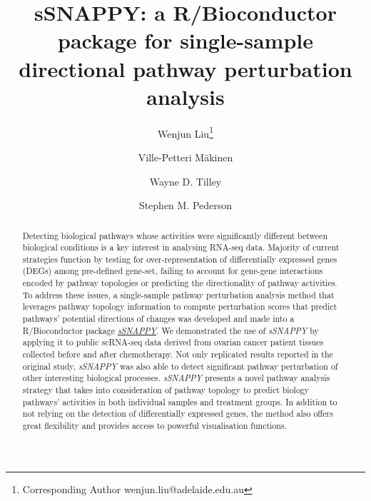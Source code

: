 \documentclass[9pt,a4paper,]{extarticle}
\begin{document}
\pagestyle{front}

\title{sSNAPPY: a R/Bioconductor package for single-sample directional pathway perturbation analysis}

\author[1]{Wenjun Liu\thanks{\ttfamily Corresponding Author wenjun.liu@adelaide.edu.au}}
\author[2,3,4,5]{Ville-Petteri Mäkinen}
\author[1]{Wayne D. Tilley}
\author[1,6,7]{Stephen M. Pederson}

\maketitle
\thispagestyle{front}

\begin{abstract}
Detecting biological pathways whose activities were significantly different between biological conditions is a key interest in analysing RNA-seq data. Majority of current strategies function by testing for over-representation of differentially expressed genes (DEGs) among pre-defined gene-set, failing to account for gene-gene interactions encoded by pathway topologies or predicting the directionality of pathway activities. To address these issues, a single-sample pathway perturbation analysis method that leverages pathway topology information to compute perturbation scores that predict pathways' potential directions of changes was developed and made into a R/Bioconductor package \href{https://bioconductor.org/packages/sSNAPPY}{\emph{sSNAPPY}}. We demonstrated the use of \emph{sSNAPPY} by applying it to public scRNA-seq data derived from ovarian cancer patient tissues collected before and after chemotherapy. Not only replicated results reported in the original study, \emph{sSNAPPY} was also able to detect significant pathway perturbation of other interesting biological processes. \emph{sSNAPPY} presents a novel pathway analysis strategy that takes into consideration of pathway topology to predict biology pathways' activities in both individual samples and treatment groups. In addition to not relying on the detection of differentially expressed genes, the method also offers great flexibility and provides access to powerful visualisation functions.
\end{abstract}
\end{document}
